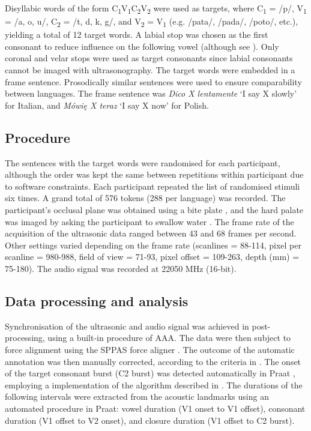 \documentclass[authoryear, twocolumn]{elsarticle}
\begin{document}
Disyllabic words of the form
C\textsubscript{1}V\textsubscript{1}C\textsubscript{2}V\textsubscript{2}
were used as targets, where C\textsubscript{1} = /p/, V\textsubscript{1}
= /a, o, u/, C\textsubscript{2} = /t, d, k, g/, and V\textsubscript{2} =
V\textsubscript{1} (e.g. /pata/, /pada/, /poto/, etc.), yielding a total
of 12 target words. A labial stop was chosen as the first consonant to
reduce influence on the following vowel (although see
\citealt{vazquez-alvarez2007}). Only coronal and velar stops were used
as target consonants since labial consonants cannot be imaged with
ultrasonography. The target words were embedded in a frame sentence.
Prosodically similar sentences were used to ensure comparability between
languages. The frame sentence was \emph{Dico X lentamente} `I say X
slowly' for Italian, and \emph{Mówię X teraz} `I say X now' for Polish.

\subsection{Procedure}\label{procedure}

The sentences with the target words were randomised for each
participant, although the order was kept the same between repetitions
within participant due to software constraints. Each participant
repeated the list of randomised stimuli six times. A grand total of 576
tokens (288 per language) was recorded. The participant's occlusal plane
was obtained using a bite plate \citep{scobbie2011}, and the hard palate
was imaged by asking the participant to swallow water
\citep{epstein2005}. The frame rate of the acquisition of the ultrasonic
data ranged between 43 and 68 frames per second. Other settings varied
depending on the frame rate (scanlines = 88-114, pixel per scanline =
980-988, field of view = 71-93, pixel offset = 109-263, depth (mm) =
75-180). The audio signal was recorded at 22050 MHz (16-bit).

\subsection{Data processing and
analysis}\label{data-processing-and-analysis}

Synchronisation of the ultrasonic and audio signal was achieved in
post-processing, using a built-in procedure of AAA. The data were then
subject to force alignment using the SPPAS force aligner
\citep{bigi2015}. The outcome of the automatic annotation was then
manually corrected, according to the criteria in .
The onset of the target consonant burst (C2 burst) was detected
automatically in Praat \citep{boersma2016}, employing a implementation
of the algorithm described in \citet{ananthapadmanabha2014}. The
durations of the following intervals were extracted from the acoustic
landmarks using an automated procedure in Praat: vowel duration (V1
onset to V1 offset), consonant duration (V1 offset to V2 onset), and
closure duration (V1 offset to C2 burst).
\end{document}
